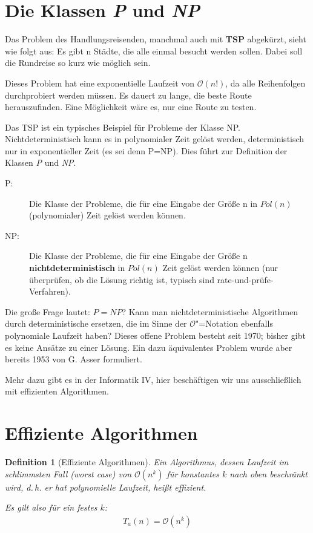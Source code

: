 \documentclass[ngerman,draft,parskip=half*,twoside]{scrreprt}
\theoremstyle{break}
\newtheorem{definition}{Definition}[chapter]
\theoremstyle{nonumberbreak}
\newcommand*{\OO}{\mathcal{O}}      %
\begin{document}
\section{Die Klassen \textit{P} und \textit{NP}}
Das Problem des Handlungsreisenden, manchmal auch mit \textbf{TSP} abgekürzt, sieht wie folgt aus:
Es gibt n Städte, die alle einmal besucht werden sollen. Dabei soll die
Rundreise so kurz wie möglich sein.

Dieses Problem hat eine exponentielle Laufzeit von $\OO(n!)$, da alle
Reihenfolgen durchprobiert werden müssen.  Es dauert zu lange, die beste
Route herauszufinden. Eine Möglichkeit wäre es, nur eine Route zu
testen.

Das TSP ist ein typisches Beispiel für Probleme der Klasse NP. 
Nichtdeterministisch kann es in polynomialer Zeit  gelöst werden, 
deterministisch nur in exponentieller Zeit (es sei denn P=NP). Dies führt zur Definition der Klassen \textit {P} und \textit {NP}.

\begin{description}
 \item[P:] Die Klasse der Probleme, die für eine Eingabe der Größe n in
  $Pol(n)$ (polynomialer) Zeit gelöst werden können.
 \item[NP:] Die Klasse der Probleme, die für eine Eingabe der Größe n
  \textbf{nichtdeterministisch} in $Pol(n)$ Zeit gelöst werden können 
  (nur überprüfen, ob die Lösung richtig ist, typisch sind
  rate-und-prüfe-Verfahren).
\end{description}

Die große Frage lautet: $P=NP$? Kann man nichtdeterministische Algorithmen durch deterministische ersetzen,
die im Sinne der $\OO$"=Notation ebenfalls polynomiale Laufzeit haben?
Dieses offene Problem besteht seit 1970; bisher gibt es keine Ansätze zu einer Lösung. Ein
dazu äquivalentes Problem wurde aber bereits 1953 von G. Asser formuliert.

Mehr dazu gibt es in der Informatik IV, hier beschäftigen wir uns ausschließlich mit effizienten Algorithmen.

\section{Effiziente Algorithmen}

\begin{definition}[Effiziente Algorithmen]
  Ein Algorithmus, dessen Laufzeit im schlimmsten Fall (\emph{worst
  case}) von $\OO(n^k)$ für konstantes $k$ nach oben beschränkt wird, d.\,h. er hat
  \emph{polynomielle Laufzeit}, heißt effizient.
  
  Es gilt also für ein festes $k$:
  \begin{gather*}
    T_a (n)= \OO(n^k)     
  \end{gather*}
\end{definition}
\end{document}

